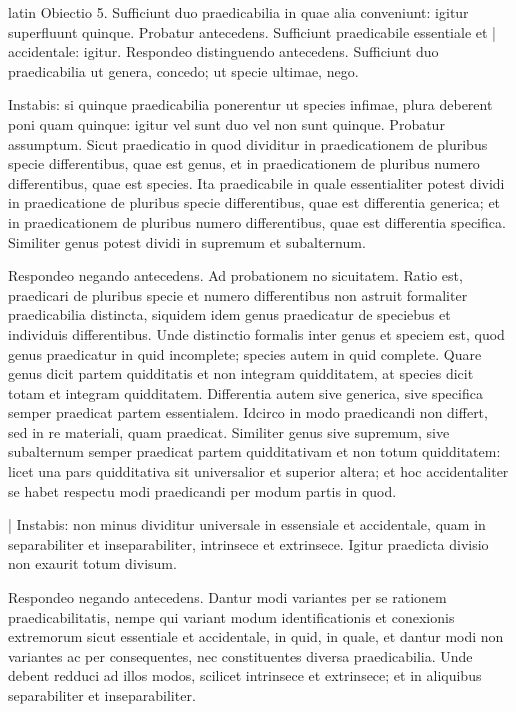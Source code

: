 \begin{otherlanguage*}{latin}
\pstart
  Obiectio 5. Sufficiunt duo praedicabilia in quae alia conveniunt: igitur superfluunt quinque. Probatur antecedens. Sufficiunt praedicabile essentiale et \textnormal{|} accidentale: igitur. Respondeo distinguendo antecedens. Sufficiunt duo praedicabilia ut genera, concedo; ut specie ultimae, nego. 
\pend

\pstart
  Instabis: si quinque praedicabilia ponerentur ut species infimae, plura deberent poni quam quinque: igitur vel sunt duo vel non sunt quinque. Probatur assumptum. Sicut praedicatio in quod dividitur in praedicationem de pluribus specie differentibus, quae est genus, et in praedicationem de pluribus numero differentibus, quae est species. Ita praedicabile in quale essentialiter potest dividi in praedicatione de pluribus specie differentibus, quae est differentia generica; et in praedicationem de pluribus numero differentibus, quae est differentia specifica. Similiter genus potest dividi in supremum et subalternum. 
\pend

\pstart
  Respondeo negando antecedens. Ad probationem no sicuitatem. Ratio est, praedicari de pluribus specie et numero differentibus non astruit formaliter praedicabilia distincta, siquidem idem genus praedicatur de speciebus et individuis differentibus. Unde distinctio formalis inter genus et speciem est, quod genus praedicatur in quid incomplete; species autem in quid complete. Quare genus dicit partem quidditatis et non integram quidditatem, at species dicit totam et integram quidditatem. Differentia autem sive generica, sive specifica semper praedicat partem essentialem. Idcirco in modo praedicandi non differt, sed in re materiali, quam praedicat. Similiter genus sive supremum, sive subalternum semper praedicat partem quidditativam et non totum quidditatem: licet una pars quidditativa sit universalior et superior altera; et hoc accidentaliter se habet respectu modi praedicandi per modum partis in quod. 
\pend

\pstart
  \textnormal{|}   Instabis: non minus dividitur universale in essensiale et accidentale, quam in separabiliter et inseparabiliter, intrinsece et extrinsece. Igitur praedicta divisio non exaurit totum divisum. 
\pend

\pstart
  Respondeo negando antecedens. Dantur modi variantes per se rationem praedicabilitatis, nempe qui variant modum identificationis et conexionis extremorum sicut essentiale et accidentale, in quid, in quale, et dantur modi non variantes ac per consequentes, nec constituentes diversa praedicabilia. Unde debent redduci ad illos modos, scilicet intrinsece et extrinsece; et in aliquibus separabiliter et inseparabiliter. 
\pend


\end{otherlanguage*}
